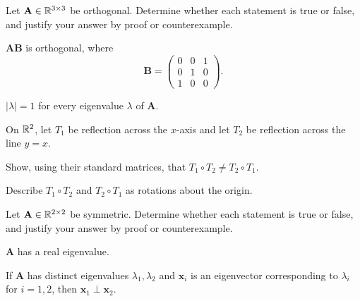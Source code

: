\begin{problem}
Let $\mathbf A\in\mathbb{R}^{3\times3}$ be orthogonal. Determine whether each statement is true or false, and justify your answer by proof or counterexample.
\begin{problemchoices}
\item $\mathbf A\mathbf B$ is orthogonal, where
\[
\mathbf B=
\begin{pmatrix}
0&0&1\\
0&1&0\\
1&0&0
\end{pmatrix}.
\]
\item $|\lambda|=1$ for every eigenvalue $\lambda$ of $\mathbf A$.
\end{problemchoices}
\end{problem}

\begin{problem}
On $\mathbb{R}^2$, let $T_1$ be reflection across the $x$-axis and let $T_2$ be reflection across the line $y=x$.
\begin{problemsubparts}
\item Show, using their standard matrices, that $T_1\circ T_2\ne T_2\circ T_1$.
\item Describe $T_1\circ T_2$ and $T_2\circ T_1$ as rotations about the origin.
\end{problemsubparts}
\end{problem}

\begin{problem}
Let $\mathbf A\in\mathbb{R}^{2\times2}$ be symmetric. Determine whether each statement is true or false, and justify your answer by proof or counterexample.
\begin{problemchoices}
\item $\mathbf A$ has a real eigenvalue.
\item If $\mathbf A$ has distinct eigenvalues $\lambda_1,\lambda_2$ and $\mathbf x_i$ is an eigenvector corresponding to $\lambda_i$ for $i=1,2$, then $\mathbf x_1\perp\mathbf x_2$.
\end{problemchoices}
\end{problem}

